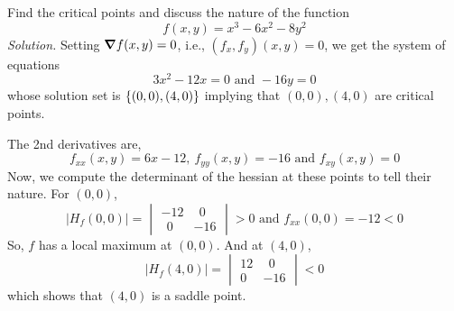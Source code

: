 \documentclass[../Analysis-3.tex]{subfiles}
\begin{document}
\begin{Eg}{}{}
  Find the critical points and discuss the nature of the function \[ f(x,y) = x^3 - 6x^2 - 8y^2 \]
  \textit{Solution.} Setting $ \grad f(x,y) = 0 $, i.e., $ (f_x,f_y)(x,y) = 0 $, we get the system of equations
  \[ 3x^2 - 12x = 0 \text{  and  }  -16y = 0\]
  whose solution set is $ \qty{(0,0),(4,0)} $ implying that $(0,0), (4,0)$ are critical points.

  The 2nd derivatives are, \[ f_{xx}(x,y) = 6x - 12,\ f_{yy}(x,y) = -16 \text{ and } f_{xy}(x,y) = 0 \]
  Now, we compute the determinant of the hessian at these points to tell their nature. For $(0,0)$,
  \[ |H_f(0,0)| =  \begin{vmatrix}
      -12   & \ \ 0 \\
      \ \ 0 & -16
    \end{vmatrix} > 0 \text{  and  } f_{xx}(0,0) = -12 < 0\]
  So, $f$ has a local maximum at $(0,0)$. And at $(4,0)$,
  \[ |H_f(4,0)| =  \begin{vmatrix}
      12 & \ \ 0 \\
      0  & -16
    \end{vmatrix} < 0 \]
  which shows that $(4,0)$ is a saddle point.
\end{Eg}
\end{document}
